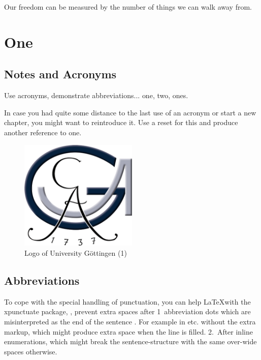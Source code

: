 \begin{savequote}[75mm]
Our freedom can be measured by the number of things we can walk away from.
\end{savequote}

\chapter{One}
\label{cha:one}

\section{Notes and Acronyms}
\label{sec:notes-acronyms}


Use acronyms, demonstrate abbreviations... \Gls{one}, \gls{two}, \glspl{one}.

In case you had quite some distance to the last use of an acronym or start a new chapter, you might want to reintroduce it. Use a reset for this and produce another reference to \gls{one}.

\begin{figure}[!ht]
  \centering
  \includegraphics[width=0.5\textwidth]{figures/UniLogo1.png}
  \caption{Logo of University Göttingen (1)}
  \label{fig:logo-1}
\end{figure}


\section{Abbreviations}
\label{sec:abbreviations}

To cope with the special handling of punctuation, you can help \LaTeX with the xpunctuate package, \ie, prevent extra spaces after 1\xperiod{}~abbreviation dots which are misinterpreted as the end of the sentence \etc. For example in etc. without the extra markup, which might produce extra space when the line is filled. 2.~After inline enumerations, which might break the sentence-structure with the same over-wide spaces otherwise.


